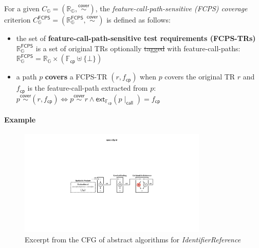 \documentclass[acmsmall,review,screen]{acmart}
\newcommand{\name}[1]{\textsf{#1}}
\newcommand{\esnt}[1]{\textit{\color{esnt}#1}}
\newcommand{\graph}{\mathbb{G}}
\newcommand{\pat}{p}
\newcommand{\cover}{\overset{\name{cover}}{\sim}}
\newcommand{\trset}[1]{\mathbb{R}_{#1}}
\newcommand{\tr}{r}
\newcommand{\cov}[1]{C_{#1}}
\newcommand{\featset}{\mathbb{F}}
\newcommand{\feat}{f}
\newcommand{\css}[1]{{#1}\!\mid_{\name{call}}}
\newcommand{\fcpset}{\featset_\name{cp}}
\newcommand{\fcp}{\feat_\name{cp}}
\newcommand{\extfcp}{\name{ext}_{\fcpset}}
\newcommand{\fcpcov}[1]{\cov{#1}^{\name{FCPS}}}
\newcommand{\fcptrset}[1]{\trset{#1}^{\name{FCPS}}}
\providecommand{\DIFdeltex}[1]{{\protect\color{red}\sout{#1}}}                      %
\providecommand{\DIFdelbegin}{} %
\providecommand{\DIFdelend}{} %
\providecommand{\DIFdel}[1]{\texorpdfstring{\DIFdeltex{#1}}{}} %
\newcommand{\DIFscaledelfig}{0.5}
\newlength{\DIFdelgraphicswidth} %
\newlength{\DIFdelgraphicsheight} %
\newcommand{\DIFdelincludegraphics}[2][]{%
\sbox{\DIFdelgraphicsbox}{\DIFOincludegraphics[#1]{#2}}%
\settoboxwidth{\DIFdelgraphicswidth}{\DIFdelgraphicsbox} %
\settoboxtotalheight{\DIFdelgraphicsheight}{\DIFdelgraphicsbox} %
\scalebox{\DIFscaledelfig}{%
\parbox[b]{\DIFdelgraphicswidth}{\usebox{\DIFdelgraphicsbox}\\[-\baselineskip] \rule{\DIFdelgraphicswidth}{0em}}\llap{\resizebox{\DIFdelgraphicswidth}{\DIFdelgraphicsheight}{%
\setlength{\unitlength}{\DIFdelgraphicswidth}%
\begin{picture}(1,1)%
\thicklines\linethickness{2pt} %
{\color[rgb]{1,0,0}\put(0,0){\framebox(1,1){}}}%
{\color[rgb]{1,0,0}\put(0,0){\line( 1,1){1}}}%
{\color[rgb]{1,0,0}\put(0,1){\line(1,-1){1}}}%
\end{picture}%
}\hspace*{3pt}}} %
} %
\DeclareRobustCommand{\DIFdelbegin}{\DIFOdelbegin \let\includegraphics\DIFdelincludegraphics} %
\DeclareRobustCommand{\DIFdelend}{\DIFOaddend \let\includegraphics\DIFOincludegraphics} %
\begin{document}
\begin{definition}\label{def:fcps-cov}
  For a given $\cov{\graph} = (\trset{\graph}, \cover)$, the
  \textit{feature-call-path-sensitive (FCPS) coverage} criterion $\fcpcov{\graph}
  = (\fcptrset{\graph}, \cover)$ is defined as follows:
  \begin{itemize}
    \item the set of \textbf{feature-call-path-sensitive test requirements
      (FCPS-TRs)} $\fcptrset{\graph}$ is a set of original TRs optionally \DIFdelbegin \DIFdel{tagged
      }\DIFdelend with
      feature-call-paths:
$
        \fcptrset{\graph} = \trset{\graph} \times (\fcpset \uplus \{ \bot \})
$
    \item a path $\pat$ \textbf{covers} a FCPS-TR $(\tr, \fcp)$ when $\pat$
      covers the original TR $\tr$ and $\fcp$ is the feature-call-path extracted
      from $\pat$:
$
        \pat \cover (\tr, \fcp) \iff \pat \cover \tr \wedge
        \extfcp(\css{\pat}) = \fcp
$
  \end{itemize}
\end{definition}


\paragraph{\textbf{Example}}

\begin{figure}
  \includegraphics[width=0.8\textwidth]{img/spec-cfg-id}
\vspace*{-.5em}
  \caption{
Excerpt from the CFG of abstract algorithms for \esnt{IdentifierReference}
  }
  \label{fig:spec-cfg-id}
\vspace*{-1em}
\end{figure}
\end{document}
